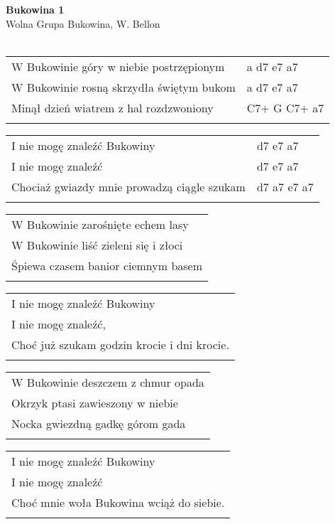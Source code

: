 \documentclass[a5paper]{article}
\begin{document}


\noindent
\fontsize{12pt}{15pt}\selectfont
\textbf{Bukowina 1} \\
\fontsize{8pt}{10pt}\selectfont
Wolna Grupa Bukowina, W. Bellon \\ \\
\fontsize{10pt}{12pt}\selectfont
{}
\begin{tabular}{@{}p{8.3cm}p{3cm}@{}}
\noindent
W Bukowinie góry w niebie postrzępionym & a d7 e7 a7 \\
W Bukowinie rosną skrzydła świętym bukom & a d7 e7 a7 \\
Minął dzień wiatrem z hal rozdzwoniony & C7+ G C7+ a7 \\ \\
\end{tabular}

\noindent
\begin{tabular}{@{}p{7.3cm}p{3cm}@{}}
I nie mogę znaleźć Bukowiny & d7 e7 a7 \\
I nie mogę znaleźć & d7 e7 a7 \\
Chociaż gwiazdy mnie prowadzą ciągle szukam & d7 a7 e7 a7 \\ \\
\end{tabular}

\noindent
\begin{tabular}{@{}p{9.5cm}@{}}
W Bukowinie zarośnięte echem lasy \\
W Bukowinie liść zieleni się i złoci \\
Śpiewa czasem banior ciemnym basem \\ \\
\end{tabular}

\noindent
\begin{tabular}{@{}p{8.5cm}@{}}
I nie mogę znaleźć Bukowiny \\
I nie mogę znaleźć, \\
Choć już szukam godzin krocie i dni krocie. \\ \\
\end{tabular}

\noindent
\begin{tabular}{@{}p{9.5cm}@{}}
W Bukowinie deszczem z chmur opada \\
Okrzyk ptasi zawieszony w niebie \\
Nocka gwiezdną gadkę górom gada \\ \\
\end{tabular}

\noindent
\begin{tabular}{@{}p{8.5cm}@{}}
I nie mogę znaleźć Bukowiny \\
I nie mogę znaleźć \\
Choć mnie woła Bukowina wciąż do siebie. \\ \\
\end{tabular}
\end{document}
